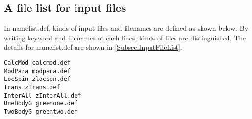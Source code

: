 \subsection{A file list for input files}
In namelist.def, kinds of input files and filenames are defined as shown below.
By writing keyword and filenames at each lines, kinds of files are distinguished. The details for namelist.def are shown in  \ref{Subsec:InputFileList}.
\\
\begin{minipage}{15cm}
\begin{screen}
\begin{verbatim}
CalcMod calcmod.def
ModPara modpara.def
LocSpin zlocspn.def
Trans zTrans.def
InterAll zInterAll.def
OneBodyG greenone.def
TwoBodyG greentwo.def
\end{verbatim}
\end{screen}
\end{minipage}

